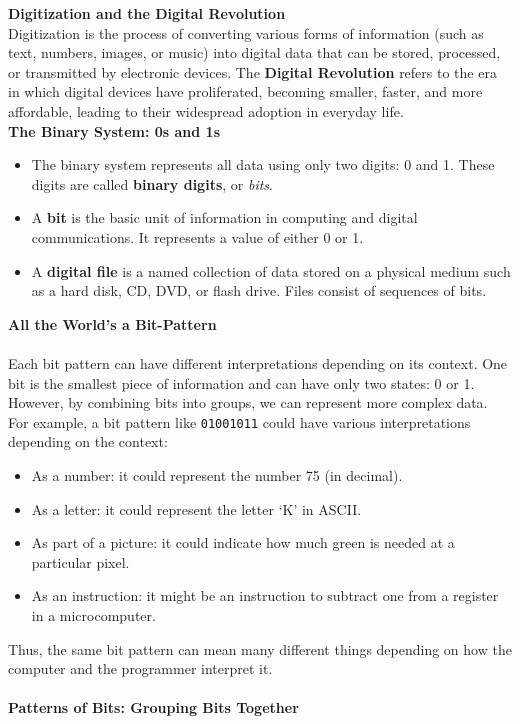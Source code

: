 \documentclass[12pt, oneside]{book}
\begin{document}
\textbf{Digitization and the Digital Revolution}\\
Digitization is the process of converting various forms of information (such as text, numbers, images, or music) into digital data that can be stored, processed, or transmitted by electronic devices. The \textbf{Digital Revolution} refers to the era in which digital devices have proliferated, becoming smaller, faster, and more affordable, leading to their widespread adoption in everyday life.\\
\textbf{The Binary System: 0s and 1s}
\begin{itemize}
	\item The binary system represents all data using only two digits: 0 and 1. These digits are called \textbf{binary digits}, or \textit{bits}.
	\item A \textbf{bit} is the basic unit of information in computing and digital communications. It represents a value of either 0 or 1.
	\item A \textbf{digital file} is a named collection of data stored on a physical medium such as a hard disk, CD, DVD, or flash drive. Files consist of sequences of bits.
\end{itemize}
\textbf{All the World’s a Bit-Pattern}\\\\
 Each bit pattern can have different interpretations depending on its context. One bit is the smallest piece of information and can have only two states: 0 or 1. However, by combining bits into groups, we can represent more complex data. For example, a bit pattern like \texttt{01001011} could have various interpretations depending on the context:
\begin{itemize}
	\item As a number: it could represent the number 75 (in decimal).
	\item As a letter: it could represent the letter ‘K’ in ASCII.
	\item As part of a picture: it could indicate how much green is needed at a particular pixel.
	\item As an instruction: it might be an instruction to subtract one from a register in a microcomputer.
\end{itemize}
Thus, the same bit pattern can mean many different things depending on how the computer and the programmer interpret it.\\\\
\textbf{Patterns of Bits: Grouping Bits Together}\\\\
\end{document}
